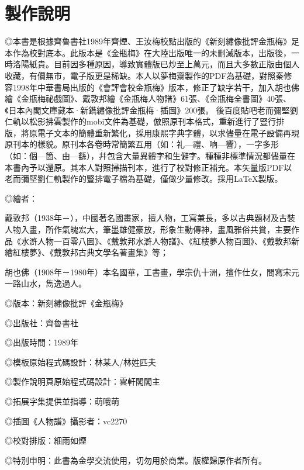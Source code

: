 \chapter*{製作說明}


◎本書是根據齊魯書社1989年齊煙、王汝梅校點出版的《新刻繡像批評金瓶梅》足本作為校對底本。此版本是《金瓶梅》在大陸出版唯一的未刪減版本，出版後，一時洛陽紙貴。目前因多種原因，導致實體版已炒至上萬元，而且大多數正版由個人收藏，有價無市，電子版更是稀缺。本人以夢梅齋製作的PDF為基礎，對照秦修容1998年中華書局出版的《會評會校金瓶梅》版本，修正了缺字若干，加入胡也佛繪《金瓶梅祕戲圖》、戴敦邦繪《金瓶梅人物譜》61張、《金瓶梅全書圖》40張、《日本內閣文庫藏本·新鐫繡像批評金瓶梅·插圖》200張。
後百度貼吧老而彌堅劉仁軌以松影拂雲製作的mobi文件為基礎，倣照原刊本格式，重新進行了豎行排版，將原電子文本的簡體重新繁化，採用康熙字典字體，以求儘量在電子設備再現原刊本的樣貌。原刊本各卷時常簡繁互用（如：礼—禮、响—響），一字多形（如：個—箇、由—繇），幷包含大量異體字和生僻字。種種非標準情況都儘量在本書內予以還原。其本人對照掃描刊本，進行了校對修正補充。本矢量版PDF以老而彌堅劉仁軌製作的豎排電子檔為基礎，僅做少量修改。採用{\LaTeX}製版。

◎繪者：

戴敦邦（1938年－），中國著名國畫家，擅人物，工寫兼長，多以古典題材及古裝人物入畫，所作氣魄宏大，筆墨雄健豪放，形象生動傳神，畫風雅俗共賞，主要作品《水滸人物一百零八圖》、《戴敦邦水滸人物譜》、《紅樓夢人物百圖》、《戴敦邦新繪紅樓夢》、《戴敦邦古典文學名著畫集》等；

胡也佛（1908年－1980年）本名國華，工書畫，學宗仇十洲，擅作仕女，間寫宋元一路山水，雋逸過人。

◎版本：新刻繡像批評《金瓶梅》

◎出版社：齊魯書社

◎出版時間：1989年

◎模板原始程式碼設計：林某人/林姓匹夫

◎製作說明頁原始程式碼設計：雲軒閣閣主

◎拓展字集提供並指導：萌哦萌

◎插圖《人物譜》攝影者：vc2270

◎校對排版：細雨如煙

◎特別申明：此書為金學交流使用，切勿用於商業。版權歸原作者所有。

\begin{quotation}
\raggedleft\small\kaishu\color{gray}{庚子歲正月製書於米國山景城}
\end{quotation}

{\insertauthorlogo}